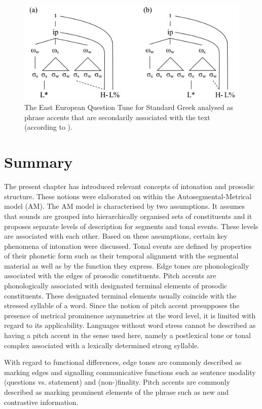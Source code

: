 \begin{figure}
  \centering 
   \includegraphics[width=1\textwidth]{figures/Figure_2_7.png}
  \caption{The East European Question Tune for Standard Greek analysed as phrase accents that are secondarily associated with the text (according to \citealt{Grice.etal2000}).} 
   \label{fig:2.7}
   \end{figure}

\section{Summary}\label{sec:2.5}
The present chapter has introduced relevant concepts of intonation and prosodic structure. These notions were elaborated on within the Autosegmental-Metrical model (AM). The AM model is characterised by two assumptions. It assumes that sounds are grouped into hierarchically organised sets of constituents and it proposes separate levels of description for segments and tonal events. These levels are associated with each other. Based on these assumptions, certain key phenomena of intonation were discussed. Tonal events are defined by properties of their phonetic form such as their temporal alignment with the segmental material as well as by the function they express. Edge tones are phonologically associated with the edges of prosodic constituents. Pitch accents are phonologically associated with designated terminal elements of prosodic constituents. These designated terminal elements usually coincide with the stressed syllable of a word. Since the notion of pitch accent presupposes the presence of metrical prominence asymmetries at the word level, it is limited with regard to its applicability. Languages without word stress cannot be described as having a pitch accent in the sense used here, namely a postlexical tone or tonal complex associated with a lexically determined strong syllable.

With regard to functional differences, edge tones are commonly described as marking edges and signalling communicative functions such as sentence modality (questions vs. statement) and (non-)finality. Pitch accents are commonly described as marking prominent elements of the phrase such as new and contrastive information. 

